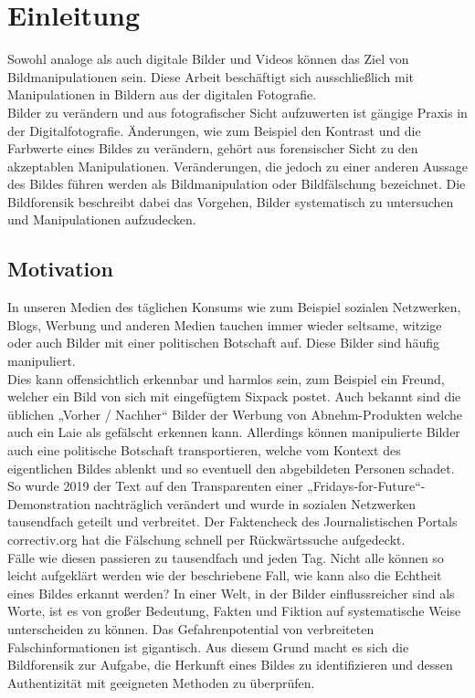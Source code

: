 \chapter{Einleitung}
Sowohl analoge als auch digitale Bilder und Videos können das Ziel von Bildmanipulationen sein. Diese Arbeit beschäftigt sich ausschließlich mit Manipulationen in Bildern aus der digitalen Fotografie.\\

Bilder zu verändern und aus fotografischer Sicht aufzuwerten ist gängige Praxis in der Digitalfotografie. Änderungen, wie zum Beispiel den Kontrast und die Farbwerte eines Bildes zu verändern, gehört aus forensischer Sicht zu den akzeptablen Manipulationen. Veränderungen, die jedoch zu einer anderen Aussage des Bildes führen werden als Bildmanipulation oder Bildfälschung bezeichnet. Die Bildforensik beschreibt dabei das Vorgehen, Bilder systematisch zu untersuchen und Manipulationen aufzudecken. 

\section{Motivation} \label{chap:motivation}
In unseren Medien des täglichen Konsums wie zum Beispiel sozialen Netzwerken, Blogs, Werbung und anderen Medien tauchen immer wieder seltsame, witzige oder auch Bilder mit einer politischen Botschaft auf. Diese Bilder sind häufig manipuliert.\\
Dies kann offensichtlich erkennbar und harmlos sein, zum Beispiel ein Freund, welcher ein Bild von sich mit eingefügtem Sixpack postet. Auch bekannt sind die üblichen „Vorher / Nachher“ Bilder der Werbung von Abnehm-Produkten welche auch ein Laie als gefälscht erkennen kann. Allerdings können manipulierte Bilder auch eine politische Botschaft transportieren, welche vom Kontext des eigentlichen Bildes ablenkt und so eventuell den abgebildeten Personen schadet.\\

So wurde 2019 der Text auf den Transparenten einer „Fridays-for-Future“-Demonstration nachträglich verändert und wurde in sozialen Netzwerken tausendfach geteilt und verbreitet. Der Faktencheck des Journalistischen Portals correctiv.org hat die Fälschung schnell per Rückwärtssuche aufgedeckt.\cite{correctiv.org2019}\\
Fälle wie diesen passieren zu tausendfach und jeden Tag. 
Nicht alle können so leicht aufgeklärt werden wie der beschriebene Fall, wie kann also die Echtheit eines Bildes erkannt werden? In einer Welt, in der Bilder einflussreicher sind als Worte, ist es von großer Bedeutung, Fakten und Fiktion auf systematische Weise unterscheiden zu können. Das Gefahrenpotential von verbreiteten Falschinformationen ist gigantisch.
Aus diesem Grund macht es sich die Bildforensik zur Aufgabe, die Herkunft eines Bildes zu identifizieren und dessen Authentizität mit geeigneten Methoden zu überprüfen.

